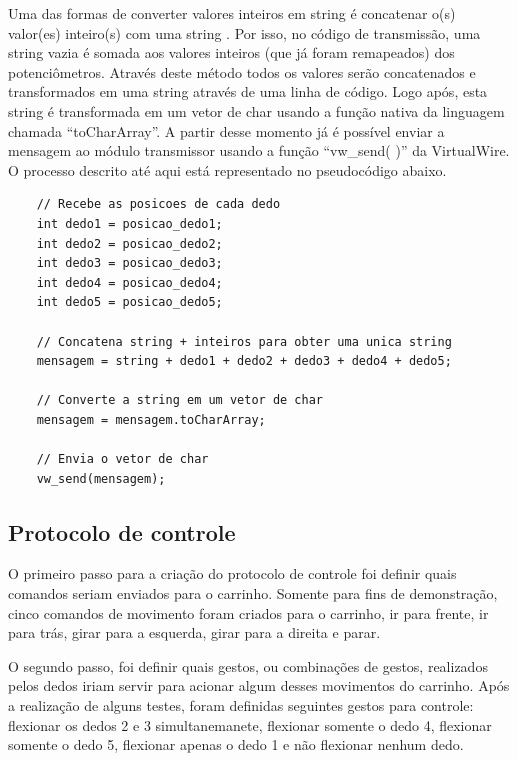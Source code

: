 \documentclass[
	12pt,				%
	openright,			%
	oneside,			%
	a4paper,			%
	english,			%
	brazil				%
	]{abntex2}
\begin{document}
		Uma das formas de converter valores inteiros em string é concatenar o(s) valor(es) inteiro(s) com uma string \cite{arduinostringadd}. Por isso, no código de transmissão, uma string vazia é somada aos valores inteiros (que já foram remapeados) dos potenciômetros. Através deste método todos os valores serão concatenados e transformados em uma string através de uma linha de código. Logo após, esta string é transformada em um vetor de char usando a função nativa da linguagem chamada ``toCharArray''. A partir desse momento já é possível enviar a mensagem ao módulo transmissor usando a função ``vw\_send( )'' da VirtualWire. O processo descrito até aqui está representado no pseudocódigo abaixo.		
\begin{lstlisting}	
	// Recebe as posicoes de cada dedo
	int dedo1 = posicao_dedo1;
	int dedo2 = posicao_dedo2;
	int dedo3 = posicao_dedo3;
	int dedo4 = posicao_dedo4;
	int dedo5 = posicao_dedo5;

	// Concatena string + inteiros para obter uma unica string
	mensagem = string + dedo1 + dedo2 + dedo3 + dedo4 + dedo5;

	// Converte a string em um vetor de char
	mensagem = mensagem.toCharArray;

	// Envia o vetor de char
	vw_send(mensagem);
\end{lstlisting}

				
		\subsection{Protocolo de controle} \label{sub:protocolo-de-controle}

		O primeiro passo para a criação do protocolo de controle foi definir quais comandos seriam enviados para o carrinho. Somente para fins de demonstração, cinco comandos de movimento foram criados para o carrinho, ir para frente, ir para trás, girar para a esquerda, girar para a direita e parar.

		O segundo passo, foi definir quais gestos, ou combinações de gestos, realizados pelos dedos iriam servir para acionar algum desses movimentos do carrinho. Após a realização de alguns testes, foram definidas seguintes gestos para controle: flexionar os dedos 2 e 3 simultanemanete, flexionar somente o dedo 4, flexionar somente o dedo 5, flexionar apenas o dedo 1 e não flexionar nenhum dedo.
\end{document}
